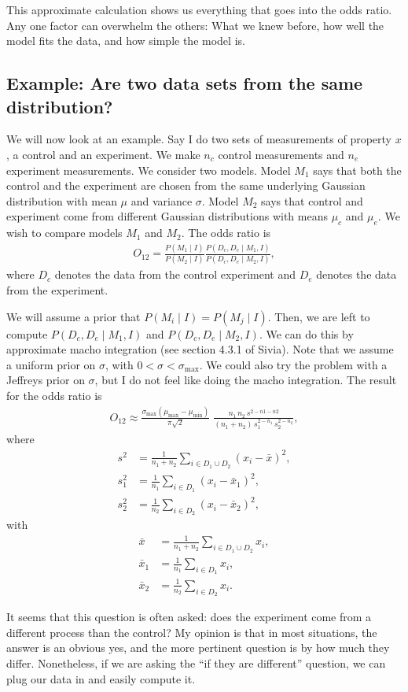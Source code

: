 This approximate calculation shows us everything that goes into the
odds ratio.  Any one factor can overwhelm the others: What we knew
before, how well the model fits the data, and how simple the model is.


\subsection{Example: Are two data sets from the same distribution?}
We will now look at an example.  Say I do two sets of measurements of
property $x$, a control and an experiment.  We make $n_c$ control
measurements and $n_e$ experiment measurements.  We consider two
models.  Model $M_1$ says that both the control and the experiment are
chosen from the same underlying Gaussian distribution with mean $\mu$
and variance $\sigma$.  Model $M_2$ says that control and experiment
come from different Gaussian distributions with means $\mu_c$ and
$\mu_e$.  We wish to compare models $M_1$ and $M_2$.  The odds ratio is
\begin{align}
O_{12} = \frac{P(M_1\mid I)}{P(M_2\mid I)} 
\frac{P(D_c,D_e\mid M_1, I)}{P(D_c,D_e\mid M_2, I)},
\end{align}
where $D_c$ denotes the data from the control experiment and $D_e$
denotes the data from the experiment.

We will assume a prior that $P(M_i\mid I) = P(M_j \mid I)$.  Then, we
are left to compute $P(D_c,D_e\mid M_1, I)$ and
$P(D_c,D_e\mid M_2, I)$.  We can do this by approximate macho
integration (see section 4.3.1 of Sivia).  Note that we assume a
uniform prior on $\sigma$, with $0 < \sigma < \sigma_\mathrm{max}$.
We could also try the problem with a Jeffreys prior on $\sigma$, but I
do not feel like doing the macho integration.  The result for the odds
ratio is
\begin{align}
O_{12} \approx \frac{\sigma_\mathrm{max}\left(\mu_\mathrm{max} - \mu_\mathrm{min}\right)}{\pi \sqrt{2}}\;\frac{n_1\,n_2\, s^{2-n1-n2}}{(n_1+n_2)\,s_1^{2-n_1}\,s_2^{2-n_2}},
\end{align}
where
\begin{align}
s^2 &= \frac{1}{n_1+n_2}\sum_{i\in D_1 \cup D_2} (x_i - \bar{x})^2, \\
s_1^2 &= \frac{1}{n_1}\sum_{i\in D_1} (x_i - \bar{x}_1)^2, \\
s_2^2 &= \frac{1}{n_2}\sum_{i\in D_2} (x_i - \bar{x}_2)^2,
\end{align}
with
\begin{align}
  \bar{x} &= \frac{1}{n_1+n_2}\sum_{i\in D_1 \cup D_2} x_i,\\
  \bar{x}_1 &= \frac{1}{n_1}\sum_{i\in D_1} x_i,\\
  \bar{x}_2 &= \frac{1}{n_2}\sum_{i\in D_2} x_i.
\end{align}

It seems that this question is often asked: does the experiment come
from a different process than the control?  My opinion is that in most
situations, the answer is an obvious yes, and the more pertinent
question is by how much they differ.  Nonetheless, if we are asking
the ``if they are different'' question, we can plug our data in and
easily compute it.

